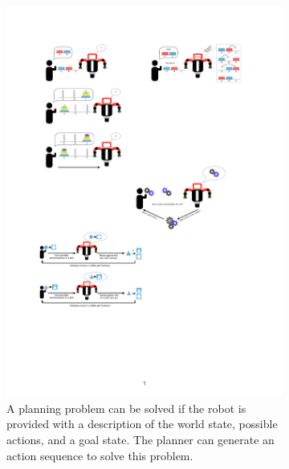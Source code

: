 \begin{figure}[htp]
	\centering
	
	\begin{subfigure}[t]{0.54\textwidth}
		\includegraphics[width=\textwidth]{figures/PbD-AutomatedPlanner}
		\caption{A planning problem can be solved if the robot is provided with a description of the world state, possible actions, and a goal state. The planner can generate an action sequence to solve this problem.}
		\label{fig:Planning domain}
	\end{subfigure}
\hfill
	\begin{subfigure}[t]{0.44\textwidth}

\end{subfigure}
\end{figure}
